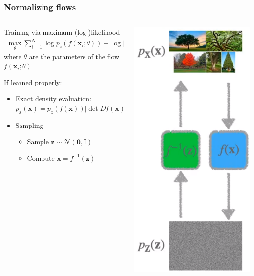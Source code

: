 \documentclass[10pt,aspectratio=169]{beamer}
\begin{document}
\begin{frame}
  \frametitle{Normalizing flows}
\begin{columns}
\begin{column}{.7\textwidth}
\small{
Training via maximum (log-)likelihood
\begin{align*}
\max_\theta \sum_{i=1}^N \log p_z( f(\mathbf{x}_i ; \theta) ) + \log | \det Df(\mathbf{x}_i;\theta) |
\end{align*}
where $\theta$ are the parameters of the flow $f(\mathbf{x}_i;\theta)$
\vspace{.5cm}

If learned properly:
\begin{itemize}
\item Exact density evaluation: $p_x(\mathbf{x})  = p_z( f(\mathbf{x}))| \det Df(\mathbf{x}) |$
\item Sampling
\begin{itemize}
\item Sample $\mathbf{z}\sim \mathcal{N}(\mathbf{0},\mathbf{I})$
\item Compute $\mathbf{x} = f^{-1}(\mathbf{z})$
\end{itemize}
\end{itemize}
}
\end{column}
\begin{column}{.3\textwidth}
\begin{center}
\includegraphics[width=.7\textwidth]{images/yeah}

\end{center}
\end{column}
\end{columns}
\end{frame}
\end{document}

